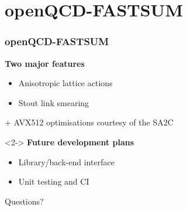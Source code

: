 \documentclass[11pt]{beamer}
\begin{document}
\section{openQCD-FASTSUM}

\begin{frame}
  \frametitle{openQCD-FASTSUM}

  {\bfseries\color{ColourBase}Two major features}
  \begin{itemize}
    \item Anisotropic lattice actions
    \item Stout link smearing
  \end{itemize}

  + AVX512 optimisations courtesy of the SA2C

  \vspace{.5cm}

  \begin{uncoverenv}<2->
    {\bfseries\color{ColourHl1}Future development plans}
    \begin{itemize}
      \item Library/back-end interface
      \item Unit testing and CI
    \end{itemize}

    \begin{center}
    \end{center}
  \end{uncoverenv}

\end{frame}

\begin{frame}[standout]
  Questions?
\end{frame}
\end{document}
